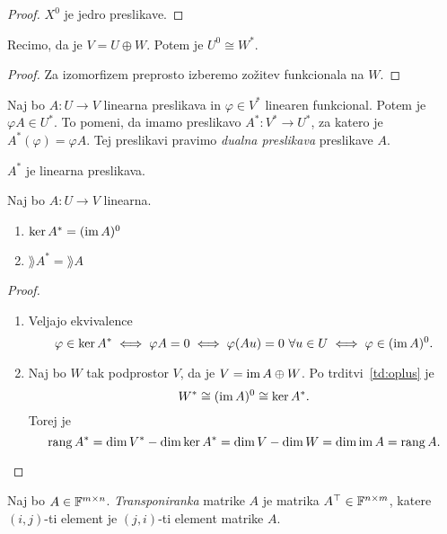\documentclass[12pt, a4paper]{article}
\begin{document}
\begin{proof}
$X^0$ je jedro preslikave.
\end{proof}

\begin{trditev}\label{td:oplus}
Recimo, da je $V=U\oplus W$. Potem je $U^0\cong W^*$.
\end{trditev}

\begin{proof}
Za izomorfizem preprosto izberemo zožitev funkcionala na $W$.
\end{proof}

\begin{definicija}
Naj bo $A\colon U\to V$ linearna preslikava in $\varphi\in V^*$ linearen funkcional. Potem je $\varphi A\in U^*$. To pomeni, da imamo preslikavo $A^*\colon V^*\to U^*$, za katero je $A^*(\varphi)=\varphi A$. Tej preslikavi pravimo \emph{dualna preslikava} preslikave $A$.
\end{definicija}

\begin{trditev}
$A^*$ je linearna preslikava.
\end{trditev}

\obvs

\begin{izrek}\label{iz:rang}
Naj bo $A\colon U\to V$ linearna.
\begin{enumerate}[label=\roman*)]
\item $\ker A^*=(\operatorname{im} A)^0$
\item $\rang A^*=\rang A$
\end{enumerate}
\end{izrek}

\begin{proof}
\begin{enumerate}[label=\roman*)]
\item Veljajo ekvivalence
\[
\varphi\in\ker A^*\iff \varphi A=0\iff \varphi(Au)=0~\forall u\in U\iff \varphi\in(\operatorname{im} A)^0.
\]
\item Naj bo $W$ tak podprostor $V$, da je $V=\operatorname{im} A\oplus W$. Po trditvi~\ref{td:oplus} je
\[
W^*\cong (\operatorname{im} A)^0\cong\ker A^*.
\]
Torej je
\[
\operatorname{rang} A^*=\dim V^*-\dim\ker A^*=\dim V-\dim W=\dim\operatorname{im} A=\operatorname{rang} A.\qedhere
\]
\end{enumerate}
\end{proof}

\begin{definicija}
Naj bo $A\in\mathbb{F}^{m\times n}$. \emph{Transponiranka} matrike $A$ je matrika $A^\top\in\mathbb{F}^{n\times m}$, katere $(i,j)$-ti element je $(j,i)$-ti element matrike $A$.
\end{definicija}
\end{document}
